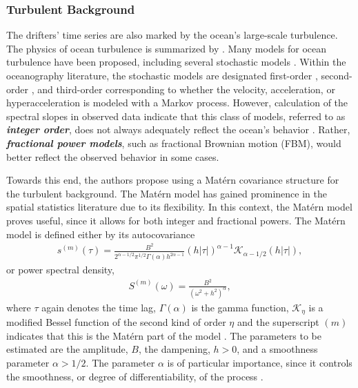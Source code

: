 \documentclass{stat572Style}
\begin{document}
\subsubsection{Turbulent Background}
The drifters' time series are also marked by the ocean's large-scale turbulence. 
The physics of ocean turbulence is summarized by \citet{Rhines1979}. 
Many models for ocean turbulence have been proposed, including several stochastic models \citep{Lacasce2008}. 
Within the oceanography literature, the stochastic models are designated  first-order \citep{Griffa1995, Falco2000}, second-order \citep{Sawford1991}, and third-order corresponding to  whether the velocity, acceleration, or hyperacceleration is modeled with a Markov process. 
However, calculation of the spectral slopes in observed data indicate that this class of models, referred to as \textbf{\it{integer order}},  does not always adequately reflect the ocean's behavior \citep{Rupolo1996, Sanderson1991}. Rather, \textbf{\it{fractional power models}}, such as fractional Brownian motion (FBM), would better reflect the observed behavior in some cases. 

Towards this end, the authors propose using a Mat\'{e}rn covariance structure \citep{Gneiting2012} for the turbulent background. 
The Mat\'{e}rn model has gained prominence in the spatial statistics literature due to its flexibility.
 In this context, the Mat\'{e}rn model proves useful, since it allows for both integer and fractional powers. 
 The Mat\'{e}rn model is defined either by its autocovariance 
\begin{align}
\label{eq:maternAC}
s^{(m)}(\tau) = \frac{B^{2}}{2^{\alpha - 1/2}\pi^{1/2} \Gamma(\alpha) h^{2 \alpha - 1}}(h|\tau|)^{\alpha - 1}\mathcal{K}_{\alpha - 1/2}(h|\tau|),
\end{align}
or power spectral density,
\begin{align}
\label{eq:maternPSD}
S^{(m)}(\omega) = \frac{B^{2}}{(\omega^{2} + h^{2})^{\alpha}},
\end{align}
where $\tau$ again denotes the time lag, $\Gamma(\alpha)$ is the gamma function,  $\mathcal{K}_{\eta}$ is a modified Bessel function of the second kind of order $\eta$  and the superscript $(m)$ indicates that this is the Mat\'{e}rn part of the model \citep{Stein2012}. 
The parameters to be estimated are the amplitude, $B$, the dampening, $h > 0$, and a smoothness parameter $\alpha > 1/2$.
 The parameter $\alpha$ is of particular importance, since it controls the smoothness, or degree of differentiability, of the process \citep{Fuentes2010}. 
\end{document}
